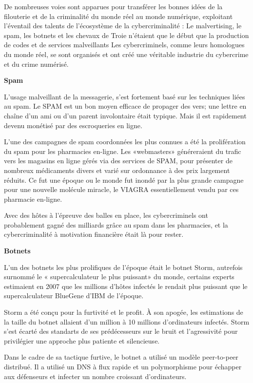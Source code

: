 De nombreuses voies sont apparues pour transférer les bonnes idées de la filouterie et de la criminalité du monde réel au monde numérique, exploitant l'éventail des talents de l'écosystème de la cybercriminalité : Le malvertising, le spam, les botnets et les chevaux de Troie n'étaient que le début que la production de codes et de services malveillants Les cybercriminels, comme leurs homologues du monde réel, se sont organisés et ont créé une véritable industrie du cybercrime et du crime numérisé.

\textbf{Spam}

L'usage malveillant de la messagerie, s'est fortement basé sur les techniques liées au spam. Le SPAM est un bon moyen efficace de propager des vers; une lettre en chaîne d'un ami ou d'un parent involontaire était typique. Mais il est rapidement devenu monétisé par des escroqueries en ligne.

L'une des campagnes de spam coordonnées les plus connues a été la prolifération du spam  pour les  pharmacies en-ligne. Les «webmasters» généreraient du trafic vers les magasins en ligne gérés via des services de SPAM, pour présenter de nombreux médicaments divers et varié sur ordonnance à des prix largement réduits. Ce fut une époque ou le monde fut inondé par la plus grande campagne pour une nouvelle molécule miracle, le VIAGRA essentiellement vendu par ces pharmacie en-ligne.

Avec des hôtes à l'épreuve des balles en place, les cybercriminels ont probablement gagné des milliards grâce au spam dans les pharmacies, et la cybercriminalité à motivation financière était là pour rester.

\textbf{Botnets}

L'un des botnets les plus prolifiques de l'époque était le botnet Storm, autrefois surnommé le « supercalculateur le plus puissant» du monde, certains experts estimaient en 2007 que les millions d'hôtes infectés le rendait plus puissant que le supercalculateur BlueGene d'IBM de l'époque.

Storm a été conçu pour la furtivité et le profit. À son apogée, les estimations de la taille du botnet allaient d’un million à 10 millions d’ordinateurs infectés. Storm s'est écarté des standarts de ses prédécesseurs sur le bruit et l'agressivité pour privilégier une approche plus patiente et silencieuse.

Dans le cadre de sa tactique furtive, le botnet a utilisé un modèle peer-to-peer distribué. Il a utilisé un DNS à flux rapide et un polymorphisme pour échapper aux défenseurs et infecter un nombre croissant d'ordinateurs.

